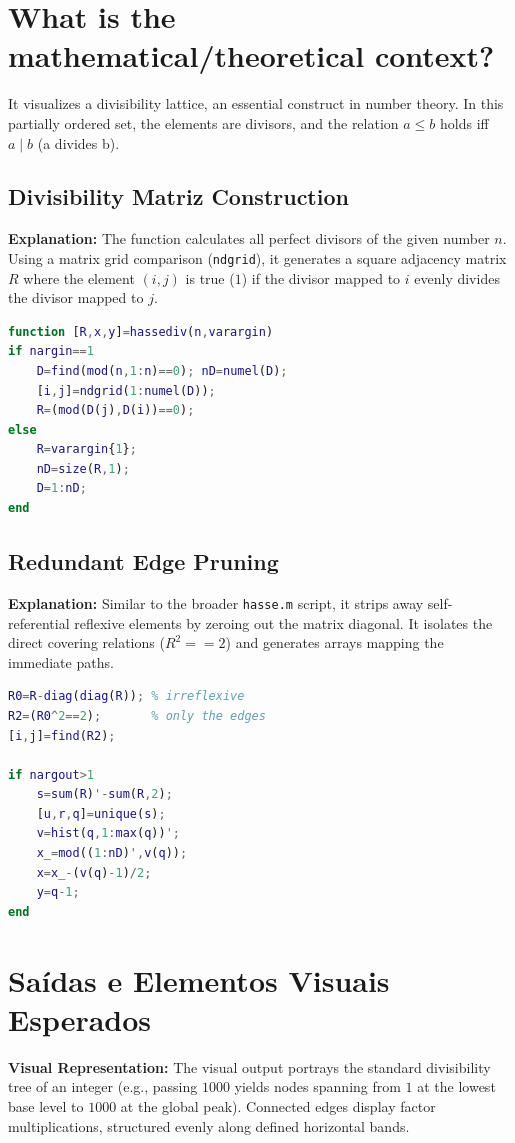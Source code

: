 \section{What is the mathematical/theoretical context?}
It visualizes a divisibility lattice, an essential construct in number theory. In this partially ordered set, the elements are divisors, and the relation $a \le b$ holds iff $a \mid b$ (a divides b). 

\subsection{Divisibility Matriz Construction}
\textbf{Explanation:} 
The function calculates all perfect divisors of the given number $n$. Using a matrix grid comparison (\texttt{ndgrid}), it generates a square adjacency matrix $R$ where the element $(i, j)$ is true ($1$) if the divisor mapped to $i$ evenly divides the divisor mapped to $j$.

\begin{lstlisting}[language=Matlab]
function [R,x,y]=hassediv(n,varargin)
if nargin==1
    D=find(mod(n,1:n)==0); nD=numel(D);
    [i,j]=ndgrid(1:numel(D));
    R=(mod(D(j),D(i))==0); 
else
    R=varargin{1};
    nD=size(R,1);
    D=1:nD;
end
\end{lstlisting}

\subsection{Redundant Edge Pruning}
\textbf{Explanation:} 
Similar to the broader \texttt{hasse.m} script, it strips away self-referential reflexive elements by zeroing out the matrix diagonal. It isolates the direct covering relations ($R^2 == 2$) and generates arrays mapping the immediate paths. 

\begin{lstlisting}[language=Matlab]
R0=R-diag(diag(R)); % irreflexive
R2=(R0^2==2);       % only the edges
[i,j]=find(R2);

if nargout>1
    s=sum(R)'-sum(R,2);
    [u,r,q]=unique(s);
    v=hist(q,1:max(q))';
    x_=mod((1:nD)',v(q));
    x=x_-(v(q)-1)/2;
    y=q-1;
end
\end{lstlisting}

\section{Saídas e Elementos Visuais Esperados}
\textbf{Visual Representation:} The visual output portrays the standard divisibility tree of an integer (e.g., passing $1000$ yields nodes spanning from $1$ at the lowest base level to $1000$ at the global peak). Connected edges display factor multiplications, structured evenly along defined horizontal bands.


